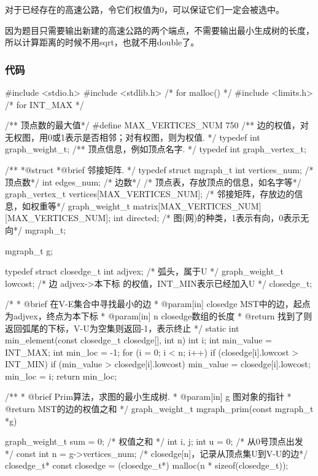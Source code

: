 对于已经存在的高速公路，令它们权值为0，可以保证它们一定会被选中。

因为题目只需要输出新建的高速公路的两个端点，不需要输出最小生成树的长度，所以计算距离的时候不用sqrt，也就不用double了。

\subsubsection{代码}
\begin{Codex}[label=poj_1751_highways_prim.c]
#include <stdio.h>
#include <stdlib.h>  /* for malloc() */
#include <limits.h>  /* for INT_MAX */

/** 顶点数的最大值*/
#define MAX_VERTICES_NUM 750
/** 边的权值，对无权图，用0或1表示是否相邻；对有权图，则为权值. */
typedef int graph_weight_t;
/** 顶点信息，例如顶点名字. */
typedef int graph_vertex_t;

/**
 *@struct
 *@brief 邻接矩阵.
 */
typedef struct mgraph_t {
    int vertices_num; /* 顶点数*/
    int edges_num; /* 边数*/
    /* 顶点表，存放顶点的信息，如名字等*/
    graph_vertex_t vertices[MAX_VERTICES_NUM];
    /* 邻接矩阵，存放边的信息，如权重等*/
    graph_weight_t matrix[MAX_VERTICES_NUM][MAX_VERTICES_NUM];
    int directed; /* 图(网)的种类，1表示有向，0表示无向*/
} mgraph_t;

mgraph_t g;

typedef struct closedge_t {
    int adjvex; /* 弧头，属于U */
    graph_weight_t lowcost; /* 边 adjvex->本下标 的权值，INT_MIN表示已经加入U */
} closedge_t;

/*
 * @brief 在V-E集合中寻找最小的边
 * @param[in] closedge MST中的边，起点为adjvex，终点为本下标
 * @param[in] n closedge数组的长度
 * @return 找到了则返回弧尾的下标，V-U为空集则返回-1，表示终止
 */
static int min_element(const closedge_t closedge[], int n) {
    int i;
    int min_value = INT_MAX;
    int min_loc = -1;
    for (i = 0; i < n; i++)
        if (closedge[i].lowcost > INT_MIN) {
            if (min_value > closedge[i].lowcost) {
                min_value = closedge[i].lowcost;
                min_loc = i;
            }
        }
    return min_loc;
}

/**
 * @brief Prim算法，求图的最小生成树.
 * @param[in] g 图对象的指针
 * @return MST的边的权值之和
 */
graph_weight_t mgraph_prim(const mgraph_t *g) {
    graph_weight_t sum = 0; /* 权值之和 */
    int i, j;
    int u = 0; /* 从0号顶点出发 */
    const int n = g->vertices_num;
    /* closedge[n]，记录从顶点集U到V-U的边*/
    closedge_t* const closedge = (closedge_t*) malloc(n * sizeof(closedge_t));

}
\end{Codex}
